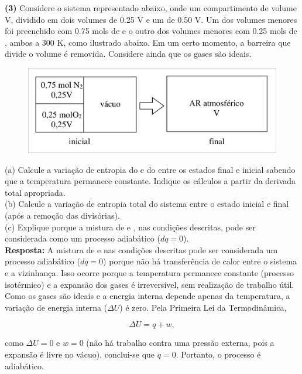 \textbf{(3)} Considere o sistema representado abaixo, onde um compartimento de
volume V, dividido em dois volumes de \num{0,25} V e um de \num{0,50} V. Um dos volumes
menores foi preenchido com \num{0,75} mols de  e o outro dos volumes menores com
\num{0,25} mols de , ambos a 300 K, como ilustrado abaixo. Em um certo momento, a
barreira que divide o volume é removida.  Considere ainda que os gases são
ideais.\\

\begin{figure}[H]
    \centering
    \includegraphics[width=.8\linewidth]{Q3.png}
\end{figure}

(a) Calcule a variação de entropia do  e do  entre os estados
final e inicial sabendo que a temperatura permanece constante. Indique os
cálculos a partir da derivada total apropriada.\\

(b) Calcule a variação de entropia total do sistema entre o estado inicial e
final (após a remoção das divisórias).\\

(c) Explique porque a mistura de  e , nas condições descritas,
pode ser considerada como um processo adiabático (\(dq= 0\)).\\

    \textbf{Resposta:} A mistura de  e  nas condições descritas pode 
    ser considerada um processo adiabático (\(dq = 0\)) porque não há transferência 
    de calor entre o sistema e a vizinhança. Isso ocorre porque a temperatura 
    permanece constante (processo isotérmico) e a expansão dos gases é irreversível, 
    sem realização de trabalho útil. Como os gases são ideais e a energia interna 
    depende apenas da temperatura, a variação de energia interna (\(\Delta U\)) é zero. 
    Pela Primeira Lei da Termodinâmica,

    \[
    \Delta U = q + w,
    \]

    como \(\Delta U = 0\) e \(w = 0\) (não há trabalho contra uma pressão externa, 
    pois a expansão é livre no vácuo), conclui-se que \(q = 0\). Portanto, o processo 
    é adiabático. 


